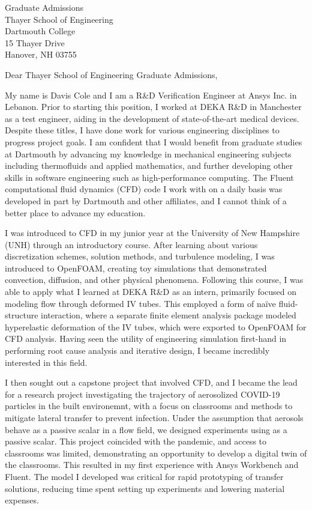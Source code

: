 \documentclass{letter}
\begin{document}
\begin{letter}{Graduate Admissions \\ Thayer School of Engineering \\ Dartmouth College \\ 15 Thayer Drive \\ Hanover, NH 03755}
    \opening{Dear Thayer School of Engineering Graduate Admissions,}

    My name is Davis Cole and I am a R\&D Verification Engineer at Ansys Inc. in Lebanon.
    Prior to starting this position, I worked at DEKA R\&D in Manchester as a test engineer, aiding in the development 
    of state-of-the-art medical devices. Despite these titles, I have done work for various engineering disciplines to 
    progress project goals. I am confident that I would benefit from graduate studies at Dartmouth by advancing my knowledge 
    in mechanical engineering subjects including thermofluids and applied mathematics, and further developing other skills 
    in software engineering such as high-performance computing. The Fluent computational fluid dynamics (CFD) code I work with on a 
    daily basis was developed in part by Dartmouth and other affiliates, and I cannot think of a better place to advance my education.

    I was introduced to CFD in my junior year at the University of New Hampshire (UNH) through an introductory course.
    After learning about various discretization schemes, solution methods, and turbulence modeling, I was introduced to OpenFOAM,
    creating toy simulations that demonstrated convection, diffusion, and other physical phenomena. Following this course,
    I was able to apply what I learned at DEKA R\&D as an intern, primarily focused on modeling flow through deformed IV tubes. 
    This employed a form of na\"ive fluid-structure interaction, where a separate finite element analysis package modeled hyperelastic 
    deformation of the IV tubes, which were exported to OpenFOAM for CFD analysis. Having seen the utility of engineering 
    simulation first-hand in performing root cause analysis and iterative design, I became incredibly interested in this field.

    I then sought out a capstone project that involved CFD, and I became the lead for a research project investigating the trajectory 
    of aerosolized COVID-19 particles in the built environemnt, with a focus on classrooms and methods to mitigate lateral transfer to 
    prevent infection. Under the assumption that aerosols behave as a passive scalar in a flow field, we designed experiments using
     as a passive scalar. This project coincided with the pandemic, and access to classrooms was limited, demonstrating an 
    opportunity to develop a digital twin of the classrooms. This resulted in my first experience with Ansys Workbench and Fluent. 
    The model I developed was critical for rapid prototyping of transfer solutions, reducing time spent setting up experiments and 
    lowering material expenses.


\end{letter}
\end{document}
